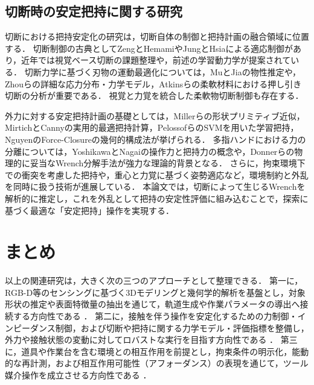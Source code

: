 \subsection{切断時の安定把持に関する研究}
切断における把持安定化の研究は，切断自体の制御と把持計画の融合領域に位置する．
切断制御の古典としてZengとHemami\cite{ZengHemami1997Cutting}やJungとHsia\cite{JungHsia1999Cutting}による適応制御があり，近年では視覚ベース切断の課題整理\cite{Singh2025VisionBasedCuttingSurvey}や，前述の学習動力学\cite{Mitsioni2021FoodCuttingDynamics}が提案されている．
切断力学に基づく刃物の運動最適化については，MuとJia\cite{MuJia2022PropertyKnifeOpt}の物性推定や，Zhouらの詳細な応力分布・力学モデル\cite{Zhou2006PressSliceI, Zhou2006PressSliceII}，Atkinsら\cite{Atkins2004CheddarSalami}の柔軟材料における押し引き切断の分析が重要である．
視覚と力覚を統合した柔軟物切断制御\cite{Long2014ForceVisionCutting}も存在する．

外力に対する安定把持計画の基礎としては，Millerら\cite{Miller2003ShapePrimitives}の形状プリミティブ近似，MirtichとCanny\cite{MirtichCanny1994OptGrasps}の実用的最適把持計算，Pelossofら\cite{Pelossof2004SVMGrasping}のSVMを用いた学習把持，Nguyen\cite{Nguyen1988ForceClosure}のForce-Closureの幾何的構成法が挙げられる．
多指ハンドにおける力の分離については，YoshikawaとNagai\cite{YoshikawaNagai1987Forces}の操作力と把持力の概念や，Donnerら\cite{Donner2018WrenchDecomposition}の物理的に妥当なWrench分解手法が強力な理論的背景となる．
さらに，拘束環境下での衝突を考慮した把持\cite{Lou2021CollisionAwareGrasping}や，重心と力覚に基づく姿勢適応\cite{Kanoulas2018CoMGraspAdapt}など，環境制約と外乱を同時に扱う技術が進展している．
本論文では，切断によって生じるWrenchを解析的に推定し，これを外乱として把持の安定性評価に組み込むことで，探索に基づく最適な「安定把持」操作を実現する．

\section{まとめ}
以上の関連研究は，大きく次の三つのアプローチとして整理できる．
第一に，RGB-D等のセンシングに基づく3Dモデリングと幾何学的解析を基盤とし，対象形状の推定や表面特徴量の抽出を通じて，軌道生成や作業パラメータの導出へ接続する方向性である
\cite{Yuan2021RGBDIndoorSurvey,Li2024RGBTSDF,GSFusion2024,Lee2024InFusionSurf,Nguyen2013PointCloudSegSurvey,MartinezOtzeta2022RANSACSurvey,Yu2021PointCloudSlicingRobotica,Zhang2025ContourParallelToolpathPointCloud,Zeng2024ShapeFollowingLaserCleaning}．
第二に，接触を伴う操作を安定化するための力制御・インピーダンス制御，および切断や把持に関する力学モデル・評価指標を整備し，外力や接触状態の変動に対してロバストな実行を目指す方向性である
\cite{Hogan1985ImpedanceControl,RaibertCraig1981Hybrid,Bicchi1995Closure,FerrariCanny1992OptimalGrasps,RoaSuarez2014GraspQualityReview,Mu2019RoboticCutting,Jamdagni2019FractureMechanicsCutting,Zhou2006PressingSlicingCutting,Long2014ForceVisionCutting,Mitsioni2021FoodCuttingDynamics,MuJia2022PropertyKnifeOpt}．
第三に，道具や作業台を含む環境との相互作用を前提とし，拘束条件の明示化，能動的な再計測，および相互作用可能性（アフォーダンス）の表現を通じて，ツール媒介操作を成立させる方向性である
\cite{Bohg2016InteractivePerception,Ardon2021AffordanceReview,Stilman2011ConstrainedManipulation,Nakatsuru2023EnvironmentSupport,Mottaghi2017GlassHalfFull}．

